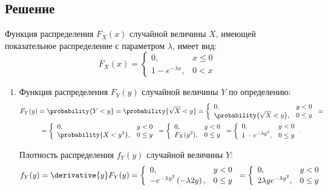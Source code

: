 \subsection*{Решение}
Функция распределения $F_X(x)$ случайной величины $X$, имеющей показательное распределение с параметром $\lambda$, имеет вид:
\begin{equation}
    F_X(x)
    = \left \{
    \begin{array}{ll}
        0,                   & x \le 0 \\
        1 - e^{-\lambda x} , & 0 < x
    \end{array}
    \right .
\end{equation}

\begin{enumerate}
    \item Функция распределения $F_Y(y)$ случайной величины $Y$ по определению:
    \begin{multline*}
        F_Y(y) = \probability{Y < y} = \probability{\sqrt{X} < y}
        = \left \{
        \begin{array}{ll}
            0 ,                         & y < 0   \\
            \probability{\sqrt{X} < y}, & 0 \le y
        \end{array}
        \right . = \\
        = \left \{
        \begin{array}{ll}
            0 ,                    & y < 0   \\
            \probability{X < y^2}, & 0 \le y
        \end{array}
        \right .
        = \left \{
        \begin{array}{ll}
            0 ,       & y < 0   \\
            F_X(y^2), & 0 \le y
        \end{array}
        \right .
        = \left \{
        \begin{array}{ll}
            0 ,                    & y < 0   \\
            1 - e^{- \lambda y^2}, & 0 \le y
        \end{array}
        \right .
        .
    \end{multline*}

    Плотность распределения $f_Y(y)$ случайной величины $Y$:
    \begin{equation}
        f_Y(y)
        = \derivative{y} F_Y(y)
        = \left \{
        \begin{array}{ll}
            0 ,                                                 & y < 0   \\
            - e^{- \lambda y^2} \left ( - \lambda 2 y \right ), & 0 \le y
        \end{array}
        \right .
        = \left \{
        \begin{array}{ll}
            0 ,                            & y < 0   \\
            2 \lambda y e^{- \lambda y^2}, & 0 \le y
        \end{array}
        \right .
    \end{equation}


\end{enumerate}
